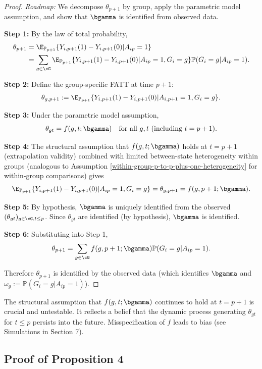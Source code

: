 \documentclass{article}
\renewcommand{\P}{\mathbb{P}}
\begin{document}
\begin{proof}
\textit{Roadmap:} We decompose $\theta_{p+1}$ by group, apply the parametric model assumption, and show that $\bgamma$ is identified from observed data.

\textbf{Step 1:} By the law of total probability,
\begin{align*}
\theta_{p+1} &= \E_{\P_{p+1}}\{Y_{i,p+1}(1) - Y_{i,p+1}(0) | A_{ip} = 1\} \\
&= \sum_{g \in \cG} \E_{\P_{p+1}}\{Y_{i,p+1}(1) - Y_{i,p+1}(0) | A_{ip} = 1, G_i = g\} \P(G_i = g | A_{ip} = 1).
\end{align*}

\textbf{Step 2:} Define the group-specific FATT at time $p+1$:
\[
\theta_{g,p+1} := \E_{\P_{p+1}}\{Y_{i,p+1}(1) - Y_{i,p+1}(0) | A_{i,p+1} = 1, G_i = g\}.
\]

\textbf{Step 3:} Under the parametric model assumption,
\[
\theta_{gt} = f(g,t;\bgamma) \quad \text{for all } g, t \text{ (including } t = p+1\text{)}.
\]

\textbf{Step 4:} The structural assumption that $f(g,t;\bgamma)$ holds at $t = p+1$ (extrapolation validity) combined with limited between-state heterogeneity within groups (analogous to Assumption \ref{within-group-p-to-p-plus-one-heterogeneity} for within-group comparisons) gives
\[
\E_{\P_{p+1}}\{Y_{i,p+1}(1) - Y_{i,p+1}(0) | A_{ip} = 1, G_i = g\} = \theta_{g,p+1} = f(g,p+1;\bgamma).
\]

\textbf{Step 5:} By hypothesis, $\bgamma$ is uniquely identified from the observed $(\theta_{gt})_{g \in \cG, t \leq p}$. Since $\theta_{gt}$ are identified (by hypothesis), $\bgamma$ is identified.

\textbf{Step 6:} Substituting into Step 1,
\[
\theta_{p+1} = \sum_{g \in \cG} f(g,p+1;\bgamma) \P(G_i = g | A_{ip} = 1).
\]

Therefore $\theta_{p+1}$ is identified by the observed data (which identifies $\bgamma$ and $\omega_g := \P(G_i = g | A_{ip} = 1)$).
\end{proof}

\begin{remark}
The structural assumption that $f(g,t;\bgamma)$ continues to hold at $t = p+1$ is crucial and untestable. It reflects a belief that the dynamic process generating $\theta_{gt}$ for $t \leq p$ persists into the future. Misspecification of $f$ leads to bias (see Simulations in Section 7).
\end{remark}

\subsection{Proof of Proposition 4}\label{app:prop4}
\end{document}

